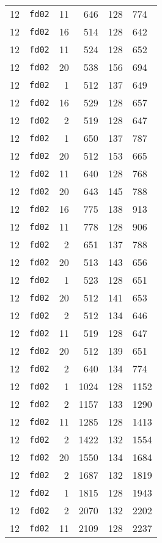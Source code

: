 \documentclass{article}
\begin{document}
\begin{table}[h!]
\begin{tabular}{llrrrl}
    12 & \texttt{fd02} & 11 & 646 & 128 & 774 \\
    12 & \texttt{fd02} & 16 & 514 & 128 & 642 \\
    12 & \texttt{fd02} & 11 & 524 & 128 & 652 \\
    12 & \texttt{fd02} & 20 & 538 & 156 & 694 \\
    12 & \texttt{fd02} & 1 & 512 & 137 & 649 \\
    12 & \texttt{fd02} & 16 & 529 & 128 & 657 \\
    12 & \texttt{fd02} & 2 & 519 & 128 & 647 \\
    12 & \texttt{fd02} & 1 & 650 & 137 & 787 \\
    12 & \texttt{fd02} & 20 & 512 & 153 & 665 \\
    12 & \texttt{fd02} & 11 & 640 & 128 & 768 \\
    12 & \texttt{fd02} & 20 & 643 & 145 & 788 \\
    12 & \texttt{fd02} & 16 & 775 & 138 & 913 \\
    12 & \texttt{fd02} & 11 & 778 & 128 & 906 \\
    12 & \texttt{fd02} & 2 & 651 & 137 & 788 \\
    12 & \texttt{fd02} & 20 & 513 & 143 & 656 \\
    12 & \texttt{fd02} & 1 & 523 & 128 & 651 \\
    12 & \texttt{fd02} & 20 & 512 & 141 & 653 \\
    12 & \texttt{fd02} & 2 & 512 & 134 & 646 \\
    12 & \texttt{fd02} & 11 & 519 & 128 & 647 \\
    12 & \texttt{fd02} & 20 & 512 & 139 & 651 \\
    12 & \texttt{fd02} & 2 & 640 & 134 & 774 \\
    12 & \texttt{fd02} & 1 & 1024 & 128 & 1152 \\
    12 & \texttt{fd02} & 2 & 1157 & 133 & 1290 \\
    12 & \texttt{fd02} & 11 & 1285 & 128 & 1413 \\
    12 & \texttt{fd02} & 2 & 1422 & 132 & 1554 \\
    12 & \texttt{fd02} & 20 & 1550 & 134 & 1684 \\
    12 & \texttt{fd02} & 2 & 1687 & 132 & 1819 \\
    12 & \texttt{fd02} & 1 & 1815 & 128 & 1943 \\
    12 & \texttt{fd02} & 2 & 2070 & 132 & 2202 \\
    12 & \texttt{fd02} & 11 & 2109 & 128 & 2237 \\

\end{tabular}
\end{table}
\end{document}
